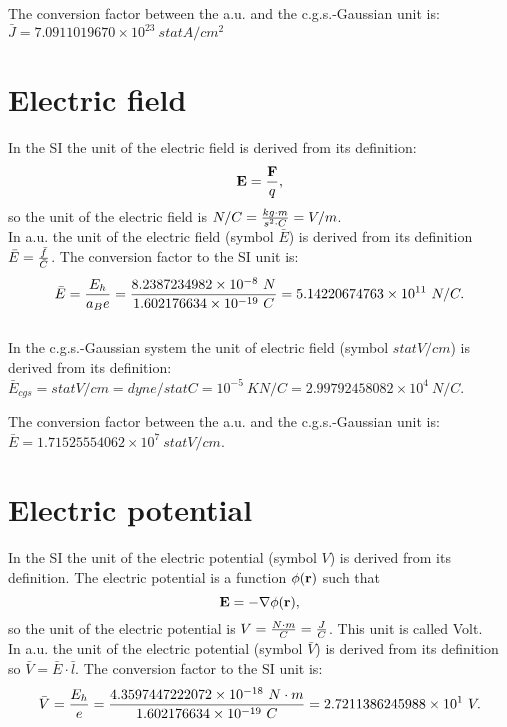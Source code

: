 \documentclass[12pt,a4paper]{article}
\def\barf{8.2387234982\times 10^{-8}}
\def\baru{4.3597447222072\times 10^{-18}}
\def\barc{1.602176634\times 10^{-19}}
\def\bare{5.14220674763\times 10^{11}}
\def\barphi{2.7211386245988\times 10^{1}}
\def\etoe{2.99792458082\times 10^{4}}
\def\barcurcgs{7.0911019670\times 10^{23}}
\def\barecgs{1.71525554062\times 10^{7}}
\begin{document}
{\color{green} 
The conversion factor between the a.u. and the c.g.s.-Gaussian unit
is: $\bar J = \barcurcgs\ statA/cm^2 $
\\

}

\newpage
\section{\color{coral}Electric field}
In the SI the unit of the electric field is derived from 
its definition:
\begin{equation}
{\bf E}={{\bf F} \over q},
\end{equation}
so the unit of the electric field is $N/C= {kg\cdot m \over s^2 \cdot C}
=V/m$.
\\

{\color{web-blue} In a.u. the unit of the electric field (symbol $\bar E$) 
is derived from its definition $\bar E={\bar f \over \bar C}$. The 
conversion factor to the SI unit is:
\begin{equation}
\bar E= {E_h\over a_B e}= {\barf\ N \over \barc\ C}= \bare\ N/C. 
\end{equation}
}
\\

{\color{orange} In the c.g.s.-Gaussian system the unit of electric field
(symbol $statV/cm$) is derived from its definition:
$\bar E_{cgs}=statV/cm=dyne / statC = {10^{-5}\ K } N/C=\etoe\ N/C$. 
\\
}

{\color{green} 
The conversion factor between the a.u. and the c.g.s.-Gaussian unit
is: $\bar E = \barecgs \ statV/cm$.
}

\newpage
\section{\color{coral}Electric potential}
In the SI the unit of the electric potential (symbol $V$)
is derived from its definition. The electric 
potential is a function $\phi({\bf r})$ such that
\begin{equation}
{\bf E}=- \nabla \phi({\bf r}),
\end{equation}
so the unit of the electric potential is $V={N \cdot m \over C}={J\over C}$. 
This unit is called Volt.
\\

{\color{web-blue} In a.u. the unit of the electric potential 
(symbol $\bar V$) 
is derived from its definition so $\bar V={\bar E \cdot \bar l}$. 
The conversion factor to the SI unit is:
\begin{equation}
\bar V= {E_h\over e}=
{\baru\ N\cdot m\over \barc\ C} =\barphi\ V.
\end{equation}
}
\\
\end{document}
